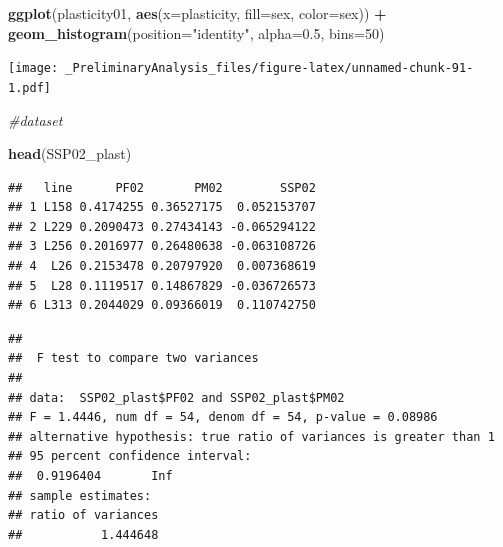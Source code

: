 \documentclass[
]{article}
\newenvironment{Shaded}{\begin{snugshade}}{\end{snugshade}}
\newcommand{\CommentTok}[1]{\textcolor[rgb]{0.56,0.35,0.01}{\textit{#1}}}
\newcommand{\DataTypeTok}[1]{\textcolor[rgb]{0.13,0.29,0.53}{#1}}
\newcommand{\DecValTok}[1]{\textcolor[rgb]{0.00,0.00,0.81}{#1}}
\newcommand{\FloatTok}[1]{\textcolor[rgb]{0.00,0.00,0.81}{#1}}
\newcommand{\KeywordTok}[1]{\textcolor[rgb]{0.13,0.29,0.53}{\textbf{#1}}}
\newcommand{\NormalTok}[1]{#1}
\newcommand{\OperatorTok}[1]{\textcolor[rgb]{0.81,0.36,0.00}{\textbf{#1}}}
\newcommand{\StringTok}[1]{\textcolor[rgb]{0.31,0.60,0.02}{#1}}
\begin{document}
\begin{Shaded}
\begin{Highlighting}[]
\KeywordTok{ggplot}\NormalTok{(plasticity01, }\KeywordTok{aes}\NormalTok{(}\DataTypeTok{x=}\NormalTok{plasticity, }\DataTypeTok{fill=}\NormalTok{sex, }\DataTypeTok{color=}\NormalTok{sex)) }\OperatorTok{+}
\StringTok{  }\KeywordTok{geom_histogram}\NormalTok{(}\DataTypeTok{position=}\StringTok{"identity"}\NormalTok{, }\DataTypeTok{alpha=}\FloatTok{0.5}\NormalTok{, }\DataTypeTok{bins=}\DecValTok{50}\NormalTok{)}
\end{Highlighting}
\end{Shaded}

\texttt{[image: \_PreliminaryAnalysis\_files/figure-latex/unnamed-chunk-91-1.pdf]}

\begin{Shaded}
\begin{Highlighting}[]
\CommentTok{#dataset }

\KeywordTok{head}\NormalTok{(SSP02_plast)}
\end{Highlighting}
\end{Shaded}

\begin{verbatim}
##   line      PF02       PM02        SSP02
## 1 L158 0.4174255 0.36527175  0.052153707
## 2 L229 0.2090473 0.27434143 -0.065294122
## 3 L256 0.2016977 0.26480638 -0.063108726
## 4  L26 0.2153478 0.20797920  0.007368619
## 5  L28 0.1119517 0.14867829 -0.036726573
## 6 L313 0.2044029 0.09366019  0.110742750
\end{verbatim}

\begin{Shaded}
\end{Shaded}

\begin{verbatim}
## 
##  F test to compare two variances
## 
## data:  SSP02_plast$PF02 and SSP02_plast$PM02
## F = 1.4446, num df = 54, denom df = 54, p-value = 0.08986
## alternative hypothesis: true ratio of variances is greater than 1
## 95 percent confidence interval:
##  0.9196404       Inf
## sample estimates:
## ratio of variances 
##           1.444648
\end{verbatim}
\end{document}
